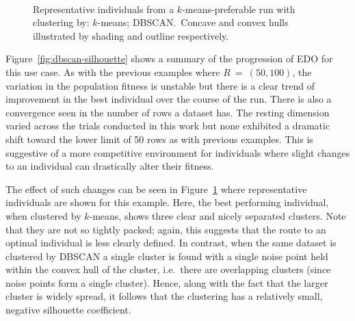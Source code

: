 \documentclass[smallextended]{svjour3}
\newlength{\imgwidth}
\begin{document}
\begin{figure}[htbp]
    \centering
    \\
    \caption[]{%
        Representative individuals from a \(k\)-means-preferable run with
        clustering by:  \(k\)-means;
         DBSCAN.\ Concave and convex hulls illustrated
        by shading and outline respectively. 
    }\label{fig:dbscan-inds}
\end{figure}

Figure~\ref{fig:dbscan-silhouette} shows a summary of the progression of EDO
for this use case. As with the previous examples where \(R~=~(50, 100)\), the
variation in the population fitness is unstable but there is a clear trend of
improvement in the best individual over the course of the run. There is also a
convergence seen in the number of rows a dataset has. The resting dimension
varied across the trials conducted in this work but none exhibited a dramatic
shift toward the lower limit of 50 rows as with previous examples. This is
suggestive of a more competitive environment for individuals where slight
changes to an individual can drastically alter their fitness.

The effect of such changes can be seen in Figure~\ref{fig:dbscan-inds} where
representative individuals are shown for this example. Here, the best performing
individual, when clustered by \(k\)-means, shows three clear and nicely
separated clusters. Note that they are not so tightly packed; again, this
suggests that the route to an optimal individual is less clearly defined. In
contrast, when the same dataset is clustered by DBSCAN a single cluster is found
with a single noise point held within the convex hull of the cluster, i.e.\
there are overlapping clusters (since noise points form a single cluster).
Hence, along with the fact that the larger cluster is widely spread, it follows
that the clustering has a relatively small, negative silhouette coefficient.
\end{document}
